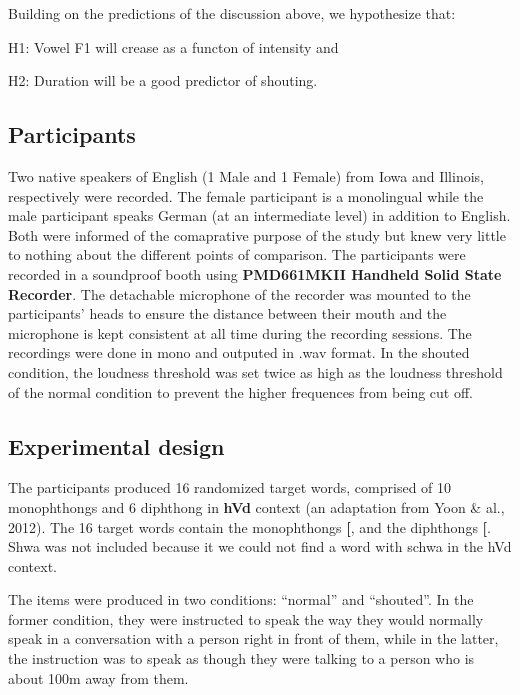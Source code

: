 \documentclass[floatsintext,man]{apa6}
\theoremstyle{definition}
\theoremstyle{definition}
\theoremstyle{definition}
\theoremstyle{remark}
\begin{document}
Building on the predictions of the discussion above, we hypothesize
that:

H1: Vowel F1 will crease as a functon of intensity and

H2: Duration will be a good predictor of shouting.

\subsection{Participants}\label{participants}

Two native speakers of English (1 Male and 1 Female) from Iowa and
Illinois, respectively were recorded. The female participant is a
monolingual while the male participant speaks German (at an intermediate
level) in addition to English. Both were informed of the comaprative
purpose of the study but knew very little to nothing about the different
points of comparison. The participants were recorded in a soundproof
booth using \textbf{PMD661MKII Handheld Solid State Recorder}. The
detachable microphone of the recorder was mounted to the participants'
heads to ensure the distance between their mouth and the microphone is
kept consistent at all time during the recording sessions. The
recordings were done in mono and outputed in .wav format. In the shouted
condition, the loudness threshold was set twice as high as the loudness
threshold of the normal condition to prevent the higher frequences from
being cut off.

\subsection{Experimental design}\label{experimental-design}

The participants produced 16 randomized target words, comprised of 10
monophthongs and 6 diphthong in \textbf{hVd} context (an adaptation from
Yoon \& al., 2012). The 16 target words contain the monophthongs
\textbf{{[}\textipa{i, I, E, A, O, u, \textrhookschwa, \textturnv, \ae, U}{]}},
and the diphthongs \textbf{{[}\textipa{eI, OI, oU, ju, aI, aU}{]}}. Shwa
was not included because it we could not find a word with schwa in the
hVd context.

The items were produced in two conditions: \enquote{normal} and
\enquote{shouted}. In the former condition, they were instructed to
speak the way they would normally speak in a conversation with a person
right in front of them, while in the latter, the instruction was to
speak as though they were talking to a person who is about 100m away
from them.
\end{document}
